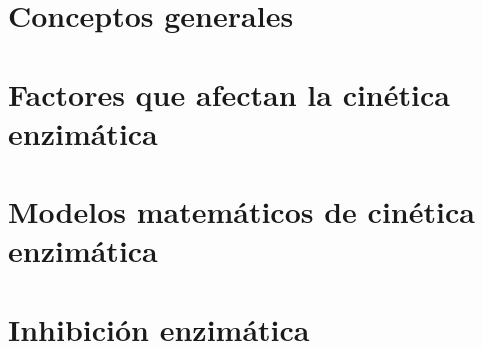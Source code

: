 \documentclass{../summarie}
\begin{document}
    \chapter{Conceptos generales}     
    \chapter{Factores que afectan la cinética enzimática}
    \chapter{Modelos matemáticos de cinética enzimática} 
    \chapter{Inhibición enzimática}


\backmatter
\end{document}

